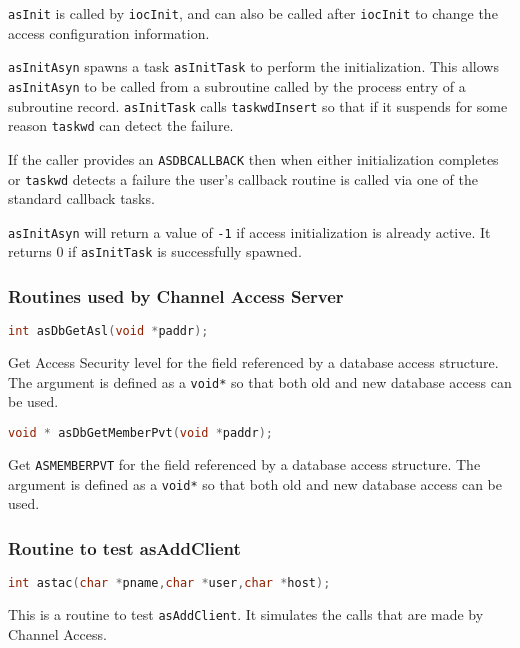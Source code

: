 \verb|asInit| is called by \verb|iocInit|, and can also be called after \verb|iocInit| to change the access configuration information.

\verb|asInitAsyn| spawns a task \verb|asInitTask| to perform the initialization.
This allows \verb|asInitAsyn| to be called from a subroutine called by the process entry of a subroutine record. \verb|asInitTask| calls \verb|taskwdInsert| so that if it suspends for some reason \verb|taskwd| can detect the failure.

If the caller provides an \verb|ASDBCALLBACK| then when either initialization completes or \verb|taskwd| detects a failure the user's callback routine is called via one of the standard callback tasks.

\verb|asInitAsyn| will return a value of \verb|-1| if access initialization is already active.
It returns 0 if \verb|asInitTask| is successfully spawned.

\subsubsection{Routines used by Channel Access Server}

\begin{lstlisting}[language=C]
int asDbGetAsl(void *paddr);
\end{lstlisting}

Get Access Security level for the field referenced by a database access structure.
The argument is defined as a \verb|void*| so that both old and new database access can be used.

\begin{lstlisting}[language=C]
void * asDbGetMemberPvt(void *paddr);
\end{lstlisting}

Get \verb|ASMEMBERPVT| for the field referenced by a database access structure.
The argument is defined as a \verb|void*| so that both old and new database access can be used.

\subsubsection{Routine to test asAddClient}

\begin{lstlisting}[language=C]
int astac(char *pname,char *user,char *host);
\end{lstlisting}

This is a routine to test \verb|asAddClient|.
It simulates the calls that are made by Channel Access.

